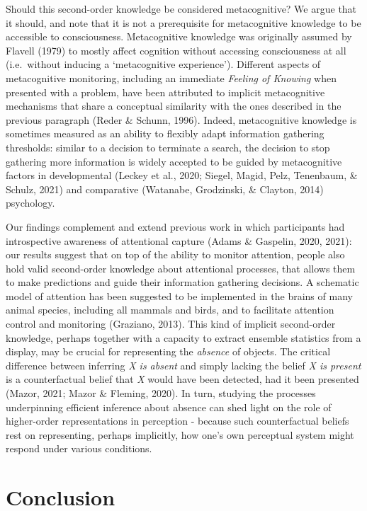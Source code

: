 \documentclass[12pt,twoside]{reedthesis}
\begin{document}
Should this second-order knowledge be considered metacognitive? We argue that it should, and note that it is not a prerequisite for metacognitive knowledge to be accessible to consciousness. Metacognitive knowledge was originally assumed by Flavell (1979) to mostly affect cognition without accessing consciousness at all (i.e.~without inducing a `metacognitive experience'). Different aspects of metacognitive monitoring, including an immediate \emph{Feeling of Knowing} when presented with a problem, have been attributed to implicit metacognitive mechanisms that share a conceptual similarity with the ones described in the previous paragraph (Reder \& Schunn, 1996). Indeed, metacognitive knowledge is sometimes measured as an ability to flexibly adapt information gathering thresholds: similar to a decision to terminate a search, the decision to stop gathering more information is widely accepted to be guided by metacognitive factors in developmental (Leckey et al., 2020; Siegel, Magid, Pelz, Tenenbaum, \& Schulz, 2021) and comparative (Watanabe, Grodzinski, \& Clayton, 2014) psychology.

Our findings complement and extend previous work in which participants had introspective awareness of attentional capture (Adams \& Gaspelin, 2020, 2021): our results suggest that on top of the ability to monitor attention, people also hold valid second-order knowledge about attentional processes, that allows them to make predictions and guide their information gathering decisions. A schematic model of attention has been suggested to be implemented in the brains of many animal species, including all mammals and birds, and to facilitate attention control and monitoring (Graziano, 2013). This kind of implicit second-order knowledge, perhaps together with a capacity to extract ensemble statistics from a display, may be crucial for representing the \emph{absence} of objects. The critical difference between inferring \emph{X is absent} and simply lacking the belief \emph{X is present} is a counterfactual belief that \emph{X} would have been detected, had it been presented (Mazor, 2021; Mazor \& Fleming, 2020). In turn, studying the processes underpinning efficient inference about absence can shed light on the role of higher-order representations in perception - because such counterfactual beliefs rest on representing, perhaps implicitly, how one's own perceptual system might respond under various conditions.

\hypertarget{conclusion}{%
\section{Conclusion}\label{conclusion}}
\end{document}
